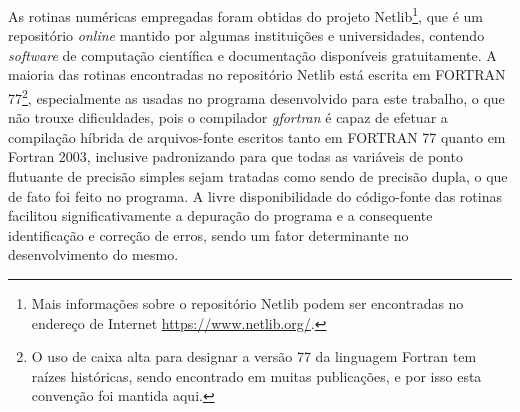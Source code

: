 As rotinas numéricas empregadas foram obtidas do projeto Netlib\footnote{Mais informações sobre o repositório Netlib podem ser encontradas no endereço de Internet \href{https://www.netlib.org/}{https://www.netlib.org/}.}, que é um repositório \textit{online} mantido por algumas instituições e universidades, contendo \textit{software} de computação científica e documentação disponíveis gratuitamente. A maioria das rotinas encontradas no repositório Netlib está escrita em FORTRAN 77\footnote{O uso de caixa alta para designar a versão 77 da linguagem Fortran tem raízes históricas, sendo encontrado em muitas publicações, e por isso esta convenção foi mantida aqui.}, especialmente as usadas no programa desenvolvido para este trabalho, o que não trouxe dificuldades, pois o compilador \textit{gfortran} é capaz de efetuar a compilação híbrida de arquivos-fonte escritos tanto em FORTRAN 77 quanto em Fortran 2003, inclusive padronizando para que todas as variáveis de ponto flutuante de precisão simples sejam tratadas como sendo de precisão dupla, o que de fato foi feito no programa.
A livre disponibilidade do código-fonte das rotinas facilitou significativamente a depuração do programa e a consequente identificação e correção de erros, sendo um fator determinante no desenvolvimento do mesmo. 

